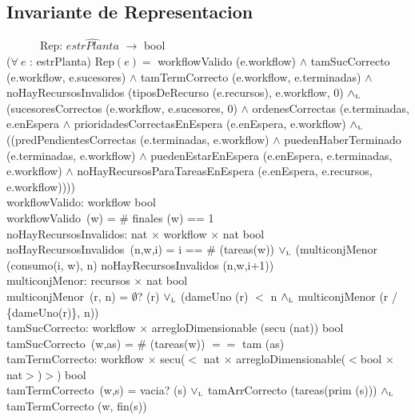 \documentclass[a4paper,10pt]{article}
\newcommand{\sombrero}{\widehat}
\begin{document}
\subsection{Invariante de Representacion}

\indent \ \ \ \ \ \ Rep: $\sombrero{estrPlanta}$ $\rightarrow$ bool \\
    
($\forall\ e$ : estrPlanta) Rep$(e) =$ workflowValido (e.workflow) $\wedge$ tamSucCorrecto (e.workflow, e.sucesores) $\wedge$ tamTermCorrecto (e.workflow, e.terminadas) $\wedge$ noHayRecursosInvalidos (tiposDeRecurso (e.recursos), e.workflow, 0) $\land_{\mathrm{\scriptscriptstyle{L}}}$ (sucesoresCorrectos (e.workflow, e.sucesores, 0) $\wedge$ ordenesCorrectas (e.terminadas, e.enEspera $\wedge$ prioridadesCorrectasEnEspera (e.enEspera, e.workflow) $\land_{\mathrm{\scriptscriptstyle{L}}}$ ((predPendientesCorrectas (e.terminadas, e.workflow) $\wedge$ puedenHaberTerminado (e.terminadas, e.workflow) $\wedge$ puedenEstarEnEspera (e.enEspera, e.terminadas, e.workflow) $\wedge$ noHayRecursosParaTareasEnEspera (e.enEspera, e.recursos, e.workflow)))) \\

workflowValido: workflow \en bool\\
	\indent workflowValido\ (w) = $\#$ finales (w) == 1 \\    
	
noHayRecursosInvalidos: nat $\times$ workflow $\times$ nat \en bool\\
	\indent noHayRecursosInvalidos\ (n,w,i) =  i == $\#$ (tareas(w)) $\lor_{\mathrm{\scriptscriptstyle{L}}}$ (multiconjMenor (consumo(i, w), n) \yluego noHayRecursosInvalidos (n,w,i+1)) \\  
	
	multiconjMenor: recursos $\times$ nat \en bool\\
	\indent multiconjMenor\ (r, n) =  $\emptyset$? (r) $\lor_{\mathrm{\scriptscriptstyle{L}}}$ (dameUno (r) $<$ n  $\land_{\mathrm{\scriptscriptstyle{L}}}$ multiconjMenor (r / \{dameUno(r)\}, n)) \\
	
	tamSucCorrecto: workflow $\times$ arregloDimensionable (secu (nat)) \en bool\\
	\indent tamSucCorrecto\ (w,as) =  $\#$ (tareas(w)) $==$ tam (as)\\
	
	tamTermCorrecto: workflow $\times$ secu($<$ nat $\times$ arregloDimensionable($<$bool $\times$ nat$>$)$>$) \en bool\\
	\indent tamTermCorrecto\ (w,s) =  vacia? (s) $\lor_{\mathrm{\scriptscriptstyle{L}}}$ tamArrCorrecto (tareas(prim (s))) $\land_{\mathrm{\scriptscriptstyle{L}}}$ tamTermCorrecto (w, fin(s)) \\  
	
\end{document}
